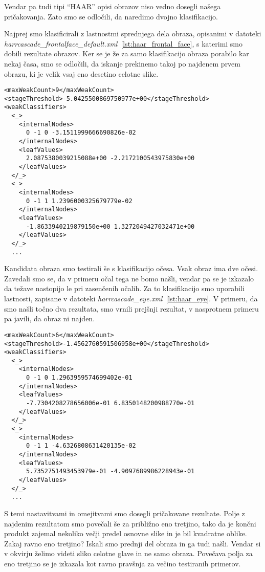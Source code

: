 Vendar pa tudi tipi ``HAAR'' opisi obrazov niso vedno dosegli našega pričakovanja. Zato smo se odločili, da naredimo dvojno klasifikacijo.

Najprej smo klasificirali z lastnostmi sprednjega dela obraza, opisanimi v datoteki
\textit{harrcascade\_frontalface\_default.xml}~\ref{lst:haar_frontal_face}, s
katerimi smo dobili rezultate obrazov. Ker se je že za samo klasifikacijo obraza porabilo kar nekaj časa, smo se odločili, da iskanje prekinemo takoj po najdenem prvem obrazu, ki je velik vsaj eno desetino celotne slike.


\begin{lstlisting}[label=lst:haar_frontal_face, caption=Izsek iz datoteke harrcascade\_frontalface\_default.xml]
<maxWeakCount>9</maxWeakCount>
<stageThreshold>-5.0425500869750977e+00</stageThreshold>
<weakClassifiers>
  <_>
    <internalNodes>
      0 -1 0 -3.1511999666690826e-02
    </internalNodes>
    <leafValues>
      2.0875380039215088e+00 -2.2172100543975830e+00
    </leafValues>
  </_>
  <_>
    <internalNodes>
      0 -1 1 1.2396000325679779e-02
    </internalNodes>
    <leafValues>
      -1.8633940219879150e+00 1.3272049427032471e+00
    </leafValues>
  </_>
  ...
\end{lstlisting}

Kandidata obraza smo testirali še s klasifikacijo očesa. Vsak obraz ima dve očesi. Zavedali smo se, da v primeru očal tega ne bomo našli, vendar pa se je izkazalo da težave nastopijo le pri zasenčenih očalih. Za to klasifikacijo smo
uporabili lastnosti, zapisane v datoteki \textit{harrcascade\_eye.xml}~\ref{lst:haar_eye}. V primeru, da smo našli točno dva rezultata, smo vrnili prejšnji rezultat, v nasprotnem primeru pa javili, da obraz ni najden.

\begin{lstlisting}[label=lst:haar_eye, caption=Izsek iz datoteke harrcascade\_eye.xml]
<maxWeakCount>6</maxWeakCount>
<stageThreshold>-1.4562760591506958e+00</stageThreshold>
<weakClassifiers>
  <_>
    <internalNodes>
      0 -1 0 1.2963959574699402e-01
    </internalNodes>
    <leafValues>
      -7.7304208278656006e-01 6.8350148200988770e-01
    </leafValues>
  </_>
  <_>
    <internalNodes>
      0 -1 1 -4.6326808631420135e-02
    </internalNodes>
    <leafValues>
      5.7352751493453979e-01 -4.9097689986228943e-01
    </leafValues>
  </_>
  ...
\end{lstlisting}

S temi nastavitvami in omejitvami smo dosegli pričakovane rezultate. Polje z najdenim rezultatom smo povečali še za približno eno tretjino, tako da je končni produkt zajemal nekoliko večji predel osnovne slike in je bil kvadratne oblike. Zakaj ravno eno tretjino? Iskali smo prednji del obraza in ga tudi našli. Vendar si v okvirju želimo videti sliko celotne glave in ne samo obraza. Povečava polja za eno tretjino se je izkazala kot ravno pravšnja za večino testiranih primerov.

